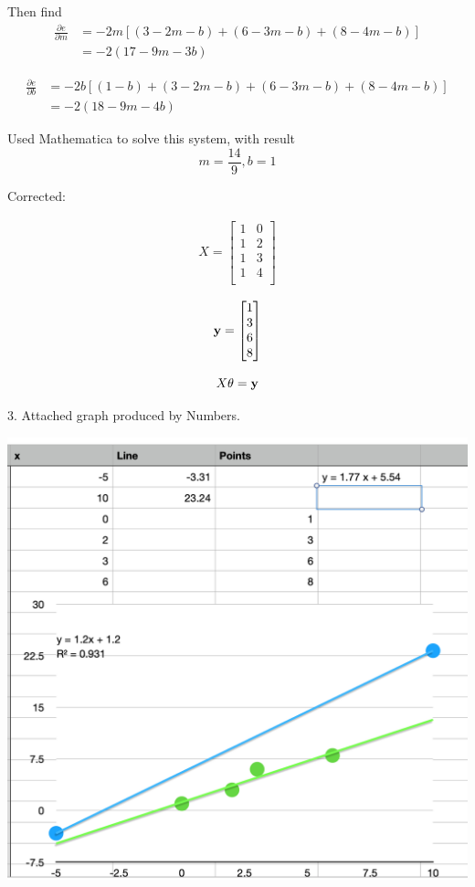 \documentclass[12pt,letterpaper]{hmcpset}
\begin{document}
\begin{solution}
Then find
\[
\begin{aligned}
\frac{\partial e}{\partial m} & = -2m[(3 - 2m - b) + (6 - 3m - b) + (8 - 4m - b)] \\
& = -2(17 - 9m - 3b)
\end{aligned}
\]

\[
\begin{aligned}
\frac{\partial e}{\partial b} & = -2b[(1-b) + (3 - 2m - b) + (6 - 3m - b) + (8 - 4m - b)] \\
& = -2(18 - 9m - 4b)
\end{aligned}
 \]

Used Mathematica to solve this system, with result
\[
  m = \frac{14}{9}, b = 1
\]

Corrected:

\[
\begin{aligned}
X =
 \begin{bmatrix}
   1 & 0 \\
   1 & 2 \\
   1 & 3 \\
   1 & 4 \\
\end{bmatrix}
\end{aligned}
\]

\[
\begin{aligned}
{\bf y} =
 \begin{bmatrix}
   1 \\
   3 \\
   6 \\
   8 \\
\end{bmatrix}
\end{aligned}
\]

\[
X \theta = {\bf y}
\]

 3. Attached graph produced by Numbers.

\includegraphics[scale=0.4]{hw1-p2-graph1.png}


\end{solution}
\end{document}
